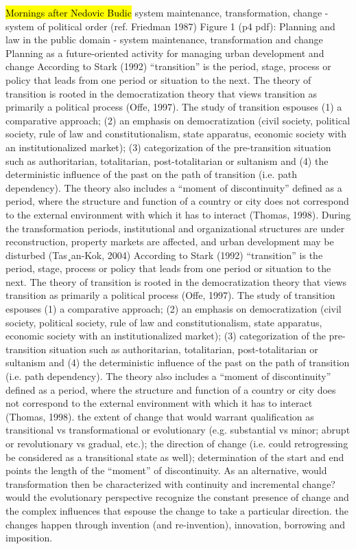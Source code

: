 \documentclass[11pt]{report}
\begin{document}
\hl{Mornings after Nedovic Budic}
system maintenance, transformation, change - system of political order (ref. Friedman 1987)
Figure 1 (p4 pdf): Planning and law in the public domain - system maintenance, transformation and change
Planning as a future-oriented activity for managing urban development and change
According to Stark (1992) “transition” is the period, stage, process or policy that leads from one period or situation to the next. The theory of transition is rooted in the democratization theory that views transition as primarily a political process (Offe, 1997). The study of transition espouses (1) a comparative approach; (2) an emphasis on democratization (civil society, political society, rule of law and constitutionalism, state apparatus, economic society with an institutionalized market); (3) categorization of the pre-transition situation such as authoritarian, totalitarian, post-totalitarian or sultanism and (4) the deterministic inﬂuence of the past on the path of transition (i.e. path dependency). The theory also includes a “moment of discontinuity” deﬁned as a period, where the structure and function of a country or city does not correspond to the external environment with which it has to interact (Thomas, 1998).
During the transformation periods, institutional and organizational structures are under reconstruction, property markets are affected, and urban development may be disturbed (Tas¸an-Kok, 2004)
According to Stark (1992) “transition” is the period, stage, process or policy that leads from one period or situation to the next. The theory of transition is rooted in the democratization theory that views transition as primarily a political process (Offe, 1997). The study of transition espouses (1) a comparative approach; (2) an emphasis on democratization (civil society, political society, rule of law and constitutionalism, state apparatus, economic society with an institutionalized market); (3) categorization of the pre-transition situation such as authoritarian, totalitarian, post-totalitarian or sultanism and (4) the deterministic inﬂuence of the past on the path of transition (i.e. path dependency). The theory also includes a “moment of discontinuity” deﬁned as a period, where the structure and function of a country or city does not correspond to the external environment with which it has to interact (Thomas, 1998).
    the extent of change that would warrant qualiﬁcation as transitional vs transformational or evolutionary (e.g. substantial vs minor; abrupt or revolutionary vs gradual, etc.);
    the direction of change (i.e. could retrogressing be considered as a transitional state as well);
    determination of the start and end points
    the length of the “moment” of discontinuity.
    As an alternative, would transformation then be characterized with continuity and incremental change?
    would the evolutionary perspective recognize the constant presence of change and the complex inﬂuences that espouse the change to take a particular direction.
    the changes happen through invention (and
    re-invention), innovation, borrowing and imposition.
\end{document}
